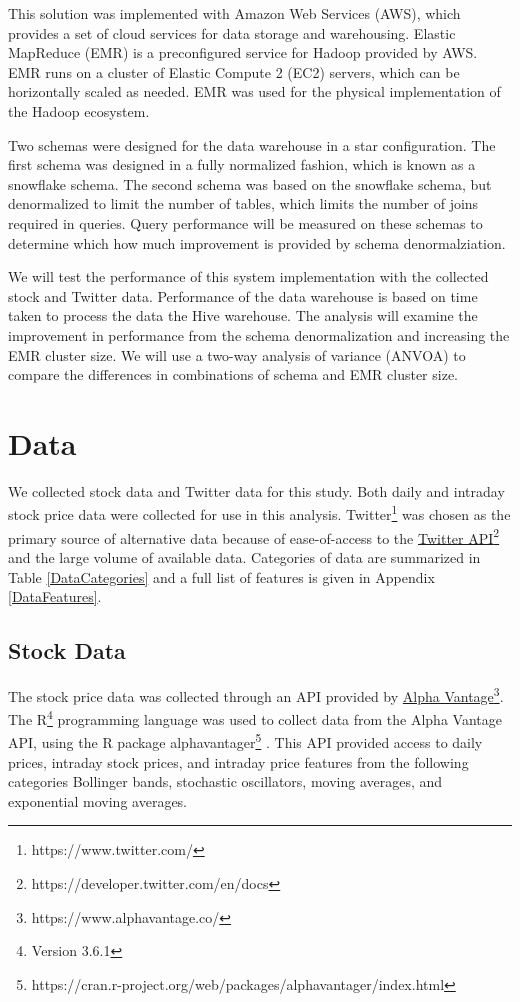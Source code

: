 \documentclass[journal]{IEEEtran}
\begin{document}
This solution was implemented with Amazon Web Services (AWS),
 which provides a set of cloud services for data storage and warehousing.
Elastic MapReduce (EMR) is a preconfigured service for Hadoop provided by AWS.
EMR runs on a cluster of Elastic Compute 2 (EC2) servers,
 which can be horizontally scaled as needed.
EMR was used for the physical implementation of the Hadoop ecosystem.

Two schemas were designed for the data warehouse in a star configuration.
The first schema was designed in a fully normalized fashion,
 which is known as a snowflake schema.
The second schema was based on the snowflake schema, 
 but denormalized to limit the number of tables, 
 which limits the number of joins required in queries.
Query performance will be measured on these schemas to determine
 which how much improvement is provided by schema denormalziation.

We will test the performance of this system implementation with the collected stock and 
 Twitter data. 
Performance of the data warehouse is based on time taken to process the data the Hive 
 warehouse.
The analysis will examine the improvement in performance from the schema denormalization and
 increasing the EMR cluster size.
We will use a two-way analysis of variance (ANVOA) to compare the differences
 in combinations of schema and EMR cluster size.

\section{Data}

We collected stock data and Twitter data for this study.
Both daily and intraday stock price data were collected
 for use in this analysis. 
Twitter\footnote{https://www.twitter.com/}
 was chosen as the primary source of alternative data because of
 ease-of-access to the 
 \href{https://developer.twitter.com/en/docs}{Twitter API}\footnote{https://developer.twitter.com/en/docs}
 and the large volume of available data.
Categories of data are summarized in Table \ref{DataCategories} and a full
 list of features is given in Appendix \ref{DataFeatures}.


\subsection{Stock Data}

The stock price data was collected through an API provided by
 \href{https://www.alphavantage.co/}{Alpha Vantage}\footnote{https://www.alphavantage.co/}.
The R\footnote{Version 3.6.1}
 programming language was used to collect data from the Alpha Vantage API,
 using the R package alphavantager\footnote{https://cran.r-project.org/web/packages/alphavantager/index.html}
\cite{R}.
This API provided access to daily prices, intraday stock prices,
 and intraday price features from the following categories Bollinger bands, 
 stochastic oscillators, moving averages, and exponential moving averages. 
\end{document}
